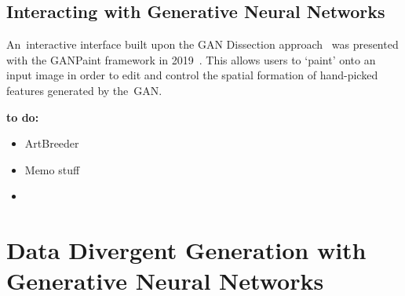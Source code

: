 \subsection{Interacting with Generative Neural Networks} 

An~interactive interface built upon the GAN Dissection approach~\citep{Bau2018-td} was presented with the GANPaint framework in 2019~\citep{bau2019semantic}. 
This allows users to `paint' onto an input image in order to edit and control the spatial formation of hand-picked features generated by the~GAN. 

\textbf{to do:}
\begin{itemize}
    \item ArtBreeder 
    \item Memo stuff 
    \item 
  \end{itemize}


\section{Data Divergent Generation with Generative Neural Networks}
\label{c2:sec:data-divergent}